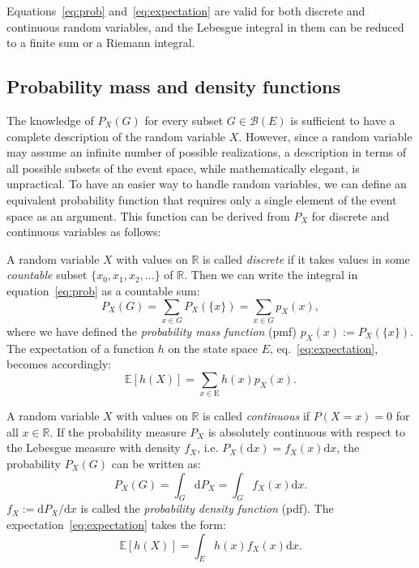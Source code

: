 \documentclass[a4paper,12pt]{book}
\begin{document}
Equations~\eqref{eq:prob} and~\eqref{eq:expectation} are valid for both discrete and continuous random variables, and the Lebesgue integral in them can be reduced to a finite sum or a Riemann integral.

\subsection{Probability mass and density functions}

The knowledge of $P_X(G)$ for every subset $G \in \mathcal{B}(E)$ is sufficient to have a complete description of the random variable $X$. However, since a random variable may assume an infinite number of possible realizations, a description in terms of all possible subsets of the event space, while mathematically elegant, is unpractical. To have an easier way to handle random variables, we can define an equivalent probability function that requires only a single element of the event space as an argument. This function can be derived from $P_X$ for discrete and continuous variables as follows:

A random variable $X$ with values on $\mathbb{R}$ is called \textit{discrete} if it takes values in some \textit{countable}
subset $ \{ x_0, x_1, x_2, . . . \}$ of $\mathbb{R}$. Then we can write the integral in equation~\eqref{eq:prob} as a countable sum:
\begin{equation}
     P_X(G)=\sum_{x \in G} P_X(\{x\})=\sum_{x \in G} p_X(x),
\end{equation}
where we have defined the \textit{probability mass function} (\acrshort{pmf}) $p_X(x) :=  P_X(\{x\})$. The expectation of a function $h$ on the state space $E$, eq.~\eqref{eq:expectation}, becomes accordingly:
\begin{equation}
    \mathbb{E}[h(X)]=\sum_{x \in \mathrm{E}} h(x) p_X(x).
\end{equation}

A random variable $X$ with values on $\mathbb{R}$ is called \textit{continuous} if $P(X=x) = 0 $ for all $ x \in \mathbb{R}$. If the probability measure $P_X$ is absolutely continuous with respect to the Lebesgue measure with density $f_X$, i.e. $P_X(\mathrm{d}x) = f_X(x) \mathrm{d}x$, the probability $P_X(G)$ can be written as:
\begin{equation}
    P_X(G)=\int_{G} \mathrm{d} P_X=\int_{G} f_X(x) \mathrm{d}x.
\end{equation}
$f_X := \mathrm{d}P_X/\mathrm{d}x$ is called the \textit{probability density function} (\acrshort{pdf}). The expectation~\eqref{eq:expectation} takes the form:
\begin{equation}
    \mathbb{E}[h(X)]=\int_{E} h(x) f_X(x) \mathrm{d}x.
\end{equation}
\end{document}
